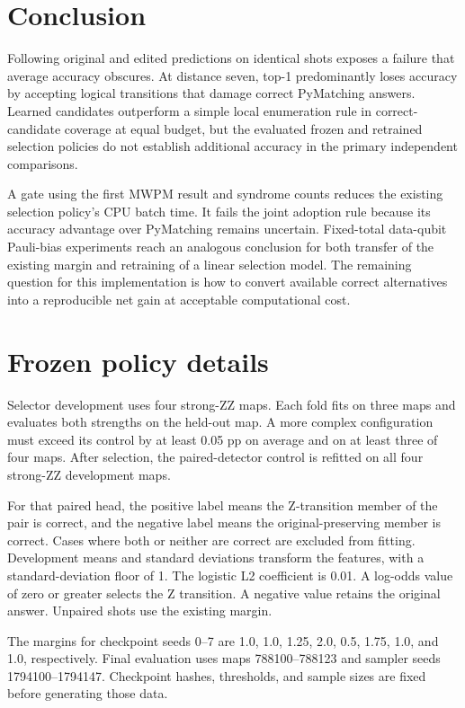 \documentclass[aps,prd,12pt,twocolumn,superscriptaddress,floatfix]{revtex4-2}
\begin{document}
\section{Conclusion}

Following original and edited predictions on identical shots exposes a failure that average accuracy obscures. At distance seven, top-1 predominantly loses accuracy by accepting logical transitions that damage correct PyMatching answers. Learned candidates outperform a simple local enumeration rule in correct-candidate coverage at equal budget, but the evaluated frozen and retrained selection policies do not establish additional accuracy in the primary independent comparisons.

A gate using the first MWPM result and syndrome counts reduces the existing selection policy's CPU batch time. It fails the joint adoption rule because its accuracy advantage over PyMatching remains uncertain. Fixed-total data-qubit Pauli-bias experiments reach an analogous conclusion for both transfer of the existing margin and retraining of a linear selection model. The remaining question for this implementation is how to convert available correct alternatives into a reproducible net gain at acceptable computational cost.

\appendix

\section{Frozen policy details}
\label{app:policies}

Selector development uses four strong-ZZ maps. Each fold fits on three maps and evaluates both strengths on the held-out map. A more complex configuration must exceed its control by at least 0.05 pp on average and on at least three of four maps. After selection, the paired-detector control is refitted on all four strong-ZZ development maps.

For that paired head, the positive label means the Z-transition member of the pair is correct, and the negative label means the original-preserving member is correct. Cases where both or neither are correct are excluded from fitting. Development means and standard deviations transform the features, with a standard-deviation floor of 1. The logistic L2 coefficient is 0.01. A log-odds value of zero or greater selects the Z transition. A negative value retains the original answer. Unpaired shots use the existing margin.

The margins for checkpoint seeds 0--7 are 1.0, 1.0, 1.25, 2.0, 0.5, 1.75, 1.0, and 1.0, respectively. Final evaluation uses maps 788100--788123 and sampler seeds 1794100--1794147. Checkpoint hashes, thresholds, and sample sizes are fixed before generating those data.
\end{document}
